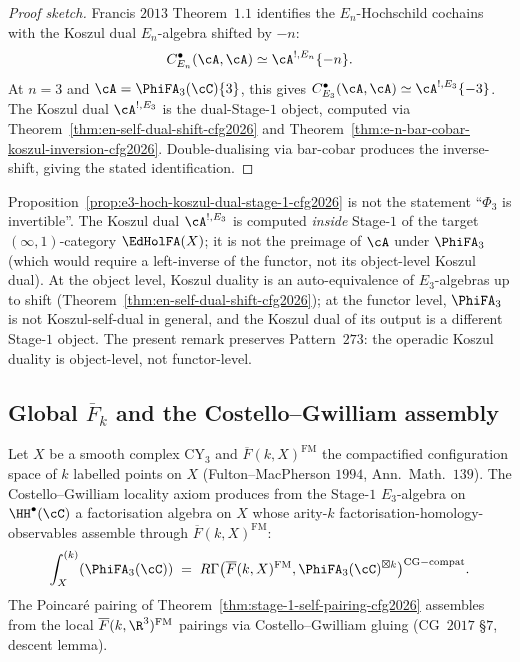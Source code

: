 \begin{proof}[Proof sketch]
Francis $2013$ Theorem~$1.1$ identifies the $E_n$-Hochschild cochains
with the Koszul dual $E_n$-algebra shifted by $-n$:
\[
  C^\bullet_{E_n}(\cA, \cA) \simeq \cA^{!, E_n}\{-n\}.
\]
At $n = 3$ and $\cA = \PhiFA_3(\cC)\{3\}$, this gives
$C^\bullet_{E_3}(\cA, \cA) \simeq \cA^{!, E_3}\{-3\}$. The Koszul dual
$\cA^{!, E_3}$ is the dual-Stage-$1$ object, computed via
Theorem~\textup{\ref{thm:en-self-dual-shift-cfg2026}} and
Theorem~\textup{\ref{thm:e-n-bar-cobar-koszul-inversion-cfg2026}}.
Double-dualising via bar-cobar produces the inverse-shift, giving the
stated identification.
\end{proof}

\begin{remark}
\label{rem:phi3-operadic-right-adjoint-cfg2026}
Proposition~\textup{\ref{prop:e3-hoch-koszul-dual-stage-1-cfg2026}} is
not the statement ``$\Phi_3$ is invertible''. The Koszul dual
$\cA^{!, E_3}$ is computed \emph{inside} Stage-$1$ of the target
$(\infty,1)$-category $\EdHolFA(X)$; it is not the preimage of $\cA$
under $\PhiFA_3$ (which would require a left-inverse of the functor,
not its object-level Koszul dual). At the object level, Koszul
duality is an auto-equivalence of $E_3$-algebras up to shift
(Theorem~\textup{\ref{thm:en-self-dual-shift-cfg2026}}); at the
functor level, $\PhiFA_3$ is not Koszul-self-dual in general, and the
Koszul dual of its output is a different Stage-$1$ object. The
present remark preserves Pattern~$273$: the operadic Koszul duality
is object-level, not functor-level.
\end{remark}

\subsection*{Global $\overline{F}_k$ and the Costello--Gwilliam assembly}

\begin{proposition}
\label{prop:global-fm-cg-assembly-cfg2026}
\ClaimStatusProvedHere
Let $X$ be a smooth complex CY$_3$ and
$\overline{F}(k, X)^{\mathrm{FM}}$ the compactified configuration
space of $k$ labelled points on $X$ (Fulton--MacPherson $1994$,
Ann.~Math.~$139$). The Costello--Gwilliam locality axiom produces
from the Stage-$1$ $E_3$-algebra on $\HH^\bullet(\cC)$ a factorisation
algebra on $X$ whose arity-$k$ factorisation-homology-observables
assemble through $\overline{F}(k, X)^{\mathrm{FM}}$:
\[
  \int_X^{(k)}(\PhiFA_3(\cC))
  \;=\;
  R\Gamma\bigl(\overline{F}(k, X)^{\mathrm{FM}},
    \PhiFA_3(\cC)^{\boxtimes k}\bigr)^{\mathrm{CG-compat}}.
\]
The Poincar\'e pairing of
Theorem~\textup{\ref{thm:stage-1-self-pairing-cfg2026}} assembles
from the local $\overline{F}(k, \R^3)^{\mathrm{FM}}$ pairings via
Costello--Gwilliam gluing (CG~$2017$ \S$7$, descent lemma).
\end{proposition}

